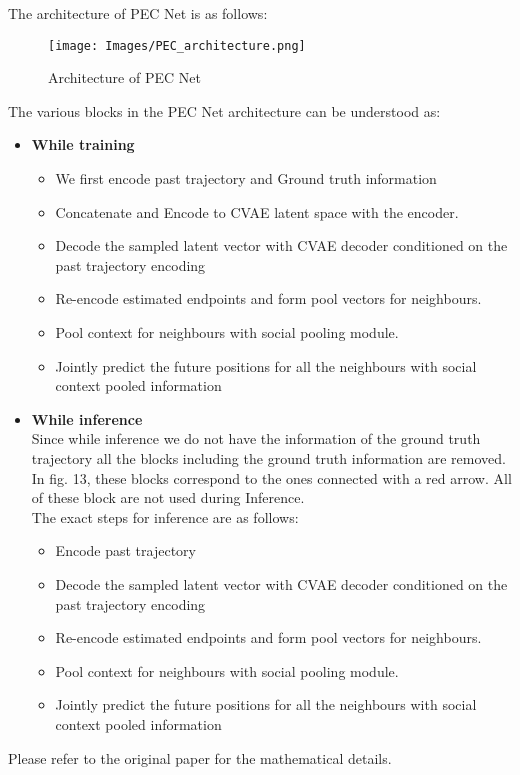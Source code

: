 \documentclass[conference]{IEEEtran}
\begin{document}
The architecture of PEC Net is as follows:
\begin{figure}[H]
  \centering
  \texttt{[image: Images/PEC\_architecture.png]}
  \caption{Architecture of PEC Net}
\end{figure}
The various blocks in the PEC Net architecture can be understood as:
\begin{itemize}
\item \textbf{While training} \\
\begin{itemize}
  \item We first encode past trajectory and Ground truth information
  \item Concatenate and Encode to CVAE latent space with the encoder.
  \item Decode the sampled latent vector with CVAE decoder conditioned on the past trajectory encoding
  \item  Re-encode estimated endpoints and form pool vectors for neighbours.
  \item Pool context for neighbours with social pooling module.
  \item Jointly predict the future positions for all the neighbours with social context pooled information
\end{itemize}

\item \textbf{While inference}\\
Since while inference we do not have the information of the ground truth trajectory all the blocks including the ground truth information are removed. In fig. 13, these blocks correspond to the ones connected with a red arrow. All of these block are not used during Inference.
\\
The exact steps for inference are as follows:
\begin{itemize}
\item Encode past trajectory
\item Decode the sampled latent vector with CVAE decoder conditioned on the past trajectory encoding
\item Re-encode estimated endpoints and form pool vectors for neighbours.
\item Pool context for neighbours with social pooling module.
\item Jointly predict the future positions for all the neighbours with social context pooled information
\end{itemize}
\end{itemize}
Please refer to the original paper\cite{PECNET} for the mathematical details.
\end{document}
